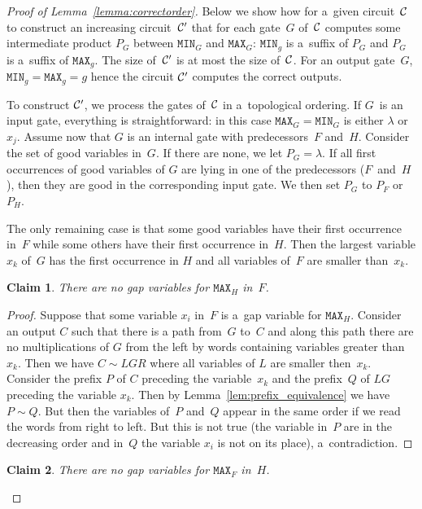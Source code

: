\documentclass[11pt,letterpaper]{article}
\newtheorem{claim}{Claim}
\newcommand{\mmin}{\texttt{MIN}}
\newcommand{\mmax}{\texttt{MAX}}
\begin{document}
\begin{proof}[Proof of Lemma~\ref{lemma:correctorder}]
Below we show how for a~given circuit~${\cal C}$ to construct an increasing circuit~${\cal C}'$ that for each gate~$G$ of~${\cal C}$ computes some intermediate product $P_G$ between $\mmin_G$ and $\mmax_G$: $\mmin_g$ is a~suffix of $P_G$ and $P_G$ is a~suffix of $\mmax_g$. The size of~${\cal C}'$ is at most the size of~${\cal C}$. For an output gate~$G$, $\mmin_g=\mmax_g=g$ hence the circuit ${\cal C}'$ computes the correct outputs.

To construct ${\cal C}'$, we process the gates of~${\cal C}$ in a~topological ordering. If $G$~is an input gate, everything is straightforward: in this case $\mmax_G=\mmin_G$ is either $\lambda$ or $x_j$. Assume now that $G$ is an internal gate with predecessors~$F$ and~$H$.
Consider the set of good variables in~$G$. If there are none, we let $P_G=\lambda$. If all first occurrences of good variables of $G$ are lying in one of the predecessors ($F$~and~$H$), then they are good in the corresponding input gate. We then set $P_G$ to $P_F$ or $P_H$.

The only remaining case is that some good variables have their first occurrence in~$F$ while some others have their first occurrence in~$H$. Then the largest variable $x_k$ of~$G$ has the first occurrence in $H$ and all variables of~$F$ are smaller than~$x_k$.

\begin{claim} \label{cl: h is good}
There are no gap variables for $\mmax_H$ in~$F$.
\end{claim}

\begin{proof}
Suppose that some variable $x_i$ in~$F$ is a~gap variable for $\mmax_H$. Consider an output $C$ such that there is a path from~$G$ to~$C$ and along this path there are no multiplications of $G$ from the left by words containing variables greater than~$x_k$. Then we have $C \sim LGR$ where all variables of $L$ are smaller then~$x_k$. Consider the prefix $P$ of $C$ preceding the variable~$x_k$ and the prefix~$Q$ of $LG$ preceding the variable $x_k$.
Then by Lemma~\ref{lem:prefix_equivalence} we have $P \sim Q$. But then the variables of~$P$ and~$Q$ appear in the same order if we read the words from right to left. But this is not true (the variable in~$P$ are in the decreasing order and in~$Q$ the variable $x_i$ is not on its place), a~contradiction.
\end{proof}

\begin{claim}\label{cl: f is good}
There are no gap variables for $\mmax_F$ in~$H$.
\end{claim}


\end{proof}
\end{document}
